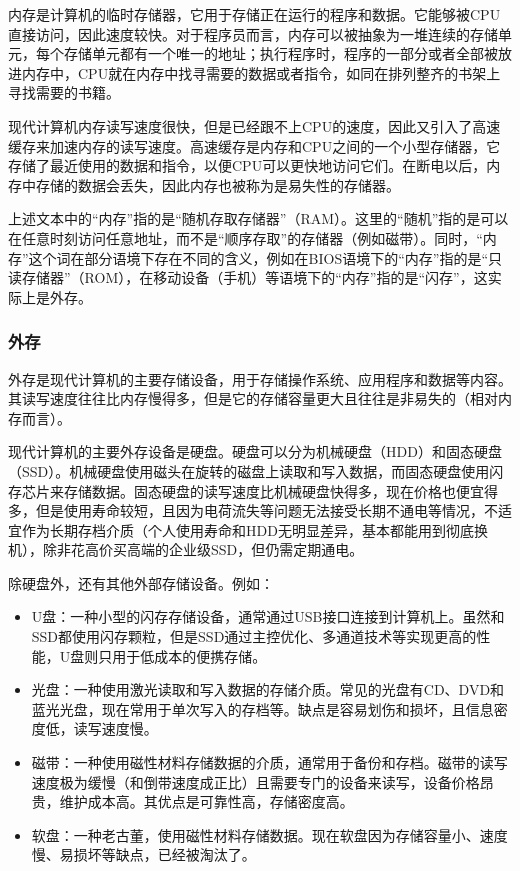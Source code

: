 内存是计算机的临时存储器，它用于存储正在运行的程序和数据。它能够被CPU直接访问，因此速度较快。对于程序员而言，内存可以被抽象为一堆连续的存储单元，每个存储单元都有一个唯一的地址；执行程序时，程序的一部分或者全部被放进内存中，CPU就在内存中找寻需要的数据或者指令，如同在排列整齐的书架上寻找需要的书籍。

现代计算机内存读写速度很快，但是已经跟不上CPU的速度，因此又引入了高速缓存来加速内存的读写速度。高速缓存是内存和CPU之间的一个小型存储器，它存储了最近使用的数据和指令，以便CPU可以更快地访问它们。在断电以后，内存中存储的数据会丢失，因此内存也被称为是易失性的存储器。

\begin{note}
  上述文本中的“内存”指的是“随机存取存储器”（RAM）。这里的“随机”指的是可以在任意时刻访问任意地址，而不是“顺序存取”的存储器（例如磁带）。同时，“内存”这个词在部分语境下存在不同的含义，例如在BIOS语境下的“内存”指的是“只读存储器”（ROM），在移动设备（手机）等语境下的“内存”指的是“闪存”，这实际上是外存。
\end{note}

\subsubsection{外存}

外存是现代计算机的主要存储设备，用于存储操作系统、应用程序和数据等内容。其读写速度往往比内存慢得多，但是它的存储容量更大且往往是非易失的（相对内存而言）。

现代计算机的主要外存设备是硬盘。硬盘可以分为机械硬盘（HDD）和固态硬盘（SSD）。机械硬盘使用磁头在旋转的磁盘上读取和写入数据，而固态硬盘使用闪存芯片来存储数据。固态硬盘的读写速度比机械硬盘快得多，现在价格也便宜得多，但是使用寿命较短，且因为电荷流失等问题无法接受长期不通电等情况，不适宜作为长期存档介质（个人使用寿命和HDD无明显差异，基本都能用到彻底换机），除非花高价买高端的企业级SSD，但仍需定期通电。

除硬盘外，还有其他外部存储设备。例如：
\begin{itemize}
  \item U盘：一种小型的闪存存储设备，通常通过USB接口连接到计算机上。虽然和SSD都使用闪存颗粒，但是SSD通过主控优化、多通道技术等实现更高的性能，U盘则只用于低成本的便携存储。
  \item 光盘：一种使用激光读取和写入数据的存储介质。常见的光盘有CD、DVD和蓝光光盘，现在常用于单次写入的存档等。缺点是容易划伤和损坏，且信息密度低，读写速度慢。
  \item 磁带：一种使用磁性材料存储数据的介质，通常用于备份和存档。磁带的读写速度极为缓慢（和倒带速度成正比）且需要专门的设备来读写，设备价格昂贵，维护成本高。其优点是可靠性高，存储密度高。
  \item 软盘：一种老古董，使用磁性材料存储数据。现在软盘因为存储容量小、速度慢、易损坏等缺点，已经被淘汰了。
\end{itemize}

